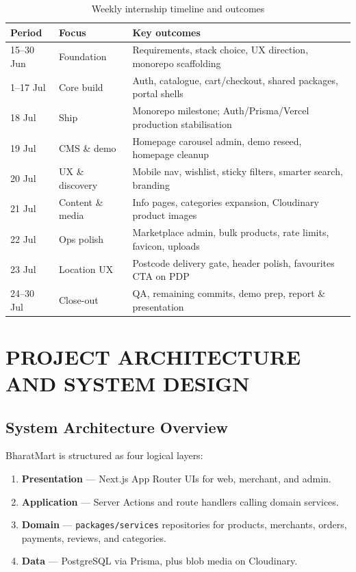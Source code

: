 \documentclass[12pt,a4paper]{report}
\begin{document}
\begin{table}[hbt!]
    \centering
    \renewcommand{\arraystretch}{1.4}
    \begin{tabular}{|p{2.6cm}|p{2.8cm}|p{7.4cm}|}
        \hline
        \textbf{Period} & \textbf{Focus} & \textbf{Key outcomes} \\
        \hline
        15--30 Jun & Foundation & Requirements, stack choice, UX direction, monorepo scaffolding \\
        \hline
        1--17 Jul & Core build & Auth, catalogue, cart/checkout, shared packages, portal shells \\
        \hline
        18 Jul & Ship & Monorepo milestone; Auth/Prisma/Vercel production stabilisation \\
        \hline
        19 Jul & CMS \& demo & Homepage carousel admin, demo reseed, homepage cleanup \\
        \hline
        20 Jul & UX \& discovery & Mobile nav, wishlist, sticky filters, smarter search, branding \\
        \hline
        21 Jul & Content \& media & Info pages, categories expansion, Cloudinary product images \\
        \hline
        22 Jul & Ops polish & Marketplace admin, bulk products, rate limits, favicon, uploads \\
        \hline
        23 Jul & Location UX & Postcode delivery gate, header polish, favourites CTA on PDP \\
        \hline
        24--30 Jul & Close-out & QA, remaining commits, demo prep, report \& presentation \\
        \hline
    \end{tabular}
    \vspace{0.2cm}
    \caption{Weekly internship timeline and outcomes}
    \label{tab:timeline}
\end{table}


\chapter{PROJECT ARCHITECTURE AND SYSTEM DESIGN}

\section{System Architecture Overview}

BharatMart is structured as four logical layers:

\begin{enumerate}
    \item \textbf{Presentation} --- Next.js App Router UIs for web, merchant,
    and admin.
    \item \textbf{Application} --- Server Actions and route handlers calling
    domain services.
    \item \textbf{Domain} --- \texttt{packages/services} repositories for
    products, merchants, orders, payments, reviews, and categories.
    \item \textbf{Data} --- PostgreSQL via Prisma, plus blob media on Cloudinary.
\end{enumerate}
\end{document}

